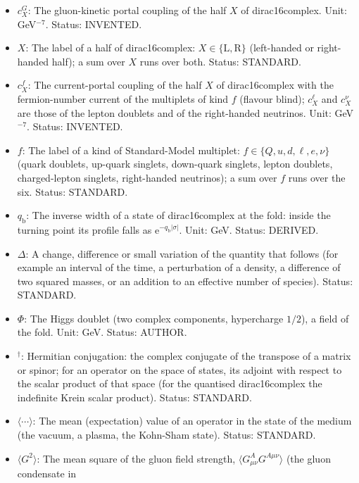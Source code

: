 \documentclass[
  10pt,
]{article}
\begin{document}
\begin{itemize}
  length\(^3\) (GeV\(^{-3}\)). Status: ASSUMED.
\item
  \(c^{G}_X\): The gluon-kinetic portal coupling of the half \(X\) of
  dirac16complex. Unit: GeV\(^{-7}\). Status: INVENTED.
\item
  \(X\): The label of a half of dirac16complex:
  \(X \in \{\mathrm{L}, \mathrm{R}\}\) (left-handed or right-handed
  half); a sum over \(X\) runs over both. Status: STANDARD.
\item
  \(c^{f}_X\): The current-portal coupling of the half \(X\) of
  dirac16complex with the fermion-number current of the multiplets of
  kind \(f\) (flavour blind); \(c^{\ell}_X\) and \(c^{\nu}_X\) are those
  of the lepton doublets and of the right-handed neutrinos. Unit:
  GeV\(^{-7}\). Status: INVENTED.
\item
  \(f\): The label of a kind of Standard-Model multiplet:
  \(f \in \{Q, u, d, \ell, e, \nu\}\) (quark doublets, up-quark
  singlets, down-quark singlets, lepton doublets, charged-lepton
  singlets, right-handed neutrinos); a sum over \(f\) runs over the six.
  Status: STANDARD.
\item
  \(q_{\mathrm{b}}\): The inverse width of a state of dirac16complex at
  the fold: inside the turning point its profile falls as
  \(\mathrm{e}^{-q_{\mathrm{b}}\lvert\sigma\rvert}\). Unit: GeV. Status:
  DERIVED.
\item
  \(\Delta\): A change, difference or small variation of the quantity
  that follows (for example an interval of the time, a perturbation of a
  density, a difference of two squared masses, or an addition to an
  effective number of species). Status: STANDARD.
\item
  \(\Phi\): The Higgs doublet (two complex components, hypercharge
  \(1/2\)), a field of the fold. Unit: GeV. Status: AUTHOR.
\item
  \({}^\dagger\): Hermitian conjugation: the complex conjugate of the
  transpose of a matrix or spinor; for an operator on the space of
  states, its adjoint with respect to the scalar product of that space
  (for the quantised dirac16complex the indefinite Krein scalar
  product). Status: STANDARD.
\item
  \(\langle\cdots\rangle\): The mean (expectation) value of an operator
  in the state of the medium (the vacuum, a plasma, the Kohn-Sham
  state). Status: STANDARD.
\item
  \(\langle G^2\rangle\): The mean square of the gluon field strength,
  \(\langle G^A_{\mu\nu}G^{A\mu\nu}\rangle\) (the gluon condensate in

\end{itemize}
\end{document}
